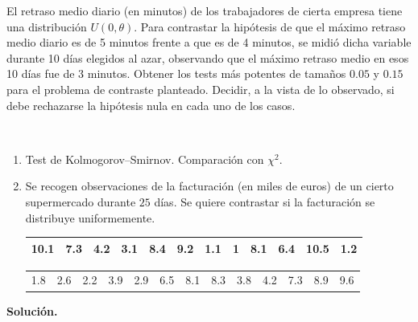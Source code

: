 \documentclass[12pt]{article}
\begin{document}
    \begin{ejercicio}[1.75 puntos]
        El retraso medio diario (en minutos) de los trabajadores de cierta empresa tiene una distribución $U(0,\theta)$. 
        Para contrastar la hipótesis de que el máximo retraso medio diario es de 5 minutos frente a que es de 4 minutos, 
        se midió dicha variable durante 10 días elegidos al azar, observando que el máximo retraso medio en esos 10 días 
        fue de 3 minutos. Obtener los tests más potentes de tamaños $0.05$ y $0.15$ para el problema de contraste planteado. 
        Decidir, a la vista de lo observado, si debe rechazarse la hipótesis nula en cada uno de los casos.
    \end{ejercicio}

    \newpage

    \begin{ejercicio}[1.5 puntos]~
        \begin{enumerate}
            \item[a)] Test de Kolmogorov--Smirnov. Comparación con $\chi^2$.
            
            \item[b)] Se recogen observaciones de la facturación (en miles de euros) de un cierto supermercado durante $25$ días.
            Se quiere contrastar si la facturación se distribuye uniformemente.
            \begin{center}
                \begin{tabular}{c|c|c|c|c|c|c|c|c|c|c|c}
                    10.1 & 7.3 & 4.2 & 3.1 & 8.4 & 9.2 & 1.1 & 1 & 8.1 & 6.4 & 10.5 & 1.2 \\
                    \hline
                \end{tabular}
                \begin{tabular}{c|c|c|c|c|c|c|c|c|c|c|c|c}
                    1.8 & 2.6 & 2.2 & 3.9 & 2.9 & 6.5 & 8.1 & 8.3 & 3.8 & 4.2 & 7.3 & 8.9 & 9.6
                \end{tabular}
            \end{center}

        \end{enumerate}
    \end{ejercicio}

    \newpage
    \noindent
    \textbf{Solución.}
    \setcounter{ejercicio}{0}
\end{document}

